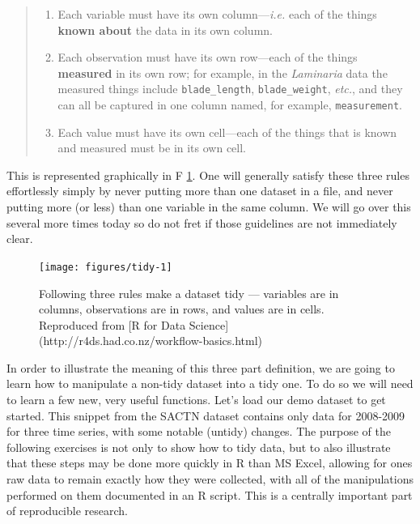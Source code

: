 \documentclass[
]{book}
\providecommand{\tightlist}{%
  \setlength{\itemsep}{0pt}\setlength{\parskip}{0pt}}
\begin{document}
\begin{quote}
\begin{enumerate}
\def\labelenumi{\arabic{enumi}.}
\tightlist
\item
  Each variable must have its own column---\emph{i.e.} each of the things \textbf{known about} the data in its own column.
\item
  Each observation must have its own row---each of the things \textbf{measured} in its own row; for example, in the \emph{Laminaria} data the measured things include \texttt{blade\_length}, \texttt{blade\_weight}, \emph{etc.}, and they can all be captured in one column named, for example, \texttt{measurement}.\\
\item
  Each value must have its own cell---each of the things that is known and measured must be in its own cell.
\end{enumerate}
\end{quote}

This is represented graphically in F \ref{fig:tidy-structure}. One will generally satisfy these three rules effortlessly simply by never putting more than one dataset in a file, and never putting more (or less) than one variable in the same column. We will go over this several more times today so do not fret if those guidelines are not immediately clear.

\begin{figure}

{\centering \texttt{[image: figures/tidy-1]} 

}

\caption{Following three rules make a dataset tidy --- variables are in columns, observations are in rows, and values are in cells. Reproduced from [R for Data Science](http://r4ds.had.co.nz/workflow-basics.html)}\label{fig:tidy-structure}
\end{figure}

In order to illustrate the meaning of this three part definition, we are going to learn how to manipulate a non-tidy dataset into a tidy one. To do so we will need to learn a few new, very useful functions. Let's load our demo dataset to get started. This snippet from the SACTN dataset contains only data for 2008-2009 for three time series, with some notable (untidy) changes. The purpose of the following exercises is not only to show how to tidy data, but to also illustrate that these steps may be done more quickly in R than MS Excel, allowing for ones raw data to remain exactly how they were collected, with all of the manipulations performed on them documented in an R script. This is a centrally important part of reproducible research.
\end{document}
